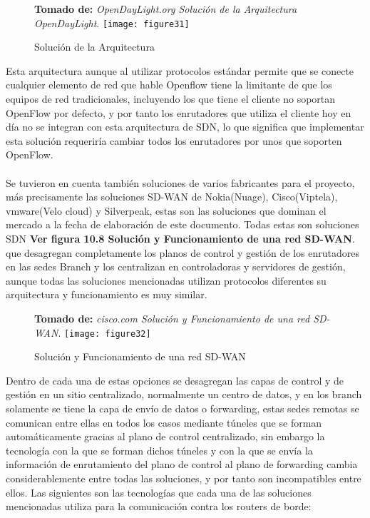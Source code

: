 \begin{figure}[htbp]
 \footnotesize{\textbf{Tomado de:} \textit{OpenDayLight.org Solución de la Arquitectura OpenDayLight}.}
  \centering
    {\texttt{[image: figure31]}}%
  \caption{\footnotesize{Solución de la Arquitectura}}
  \label{fig:fig2subfig}
\end{figure}

Esta arquitectura aunque al utilizar protocolos estándar permite que se conecte cualquier elemento de red que hable Openflow tiene la limitante de que los equipos de red tradicionales, incluyendo los que tiene el cliente no soportan OpenFlow por defecto, y por tanto los enrutadores que utiliza el cliente hoy en día no se integran con esta arquitectura de SDN, lo que significa que implementar esta solución requeriría cambiar todos los enrutadores por unos que soporten OpenFlow.
\\
\\
Se tuvieron en cuenta también soluciones de varios fabricantes para el proyecto, más precisamente las soluciones SD-WAN de Nokia(Nuage), Cisco(Viptela), vmware(Velo cloud) y Silverpeak, estas son las soluciones que dominan el mercado a la fecha de elaboración de este documento. Todas estas son soluciones SDN \textbf{Ver figura 10.8 Solución y Funcionamiento de una red SD-WAN}. que desagregan completamente los planos de control y gestión de los enrutadores en las sedes Branch y los centralizan en controladoras y servidores de gestión, aunque todas las soluciones mencionadas utilizan protocolos diferentes su arquitectura y funcionamiento es muy similar.
\begin{figure}[htbp]
 \footnotesize{\textbf{Tomado de:} \textit{cisco.com Solución y Funcionamiento de una red SD-WAN}.}
  \centering
    {\texttt{[image: figure32]}}%
  \caption{\footnotesize{Solución y Funcionamiento de una red SD-WAN}}
  \label{fig:fig2subfig}
\end{figure}
Dentro de cada una de estas opciones se desagregan las capas de control y de gestión en un sitio centralizado, normalmente un centro de datos, y en los branch solamente se tiene la capa de envío de datos o forwarding, estas sedes remotas se comunican entre ellas en todos los casos mediante túneles que se forman automáticamente gracias al plano de control centralizado, sin embargo la tecnología con la que se forman dichos túneles y con la que se envía la información de enrutamiento del plano de control al plano de forwarding cambia considerablemente entre todas las soluciones, y por tanto son incompatibles entre ellos. Las siguientes son las tecnologías que cada una de las soluciones mencionadas utiliza para la comunicación contra los routers de borde:
